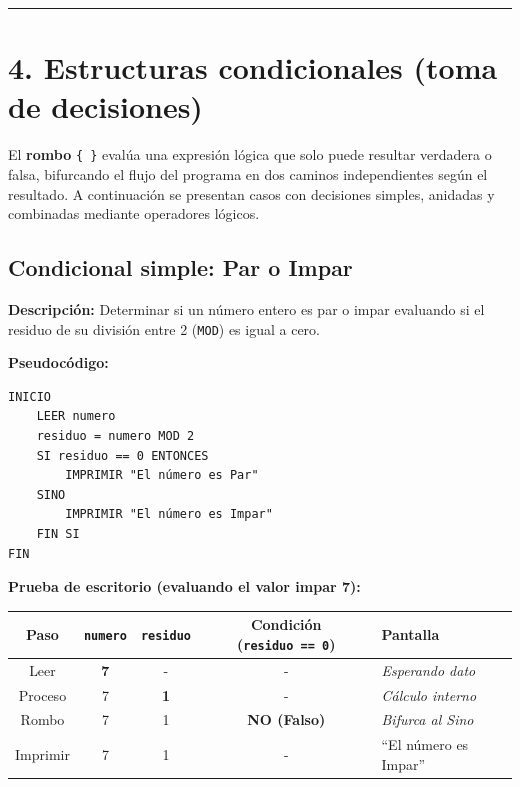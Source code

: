 \begin{center}\rule{0.5\linewidth}{0.5pt}\end{center}

\section{4. Estructuras condicionales (toma de
decisiones)}\label{estructuras-condicionales-toma-de-decisiones}

El \textbf{rombo} \texttt{\{\ \}} evalúa una expresión lógica que solo
puede resultar verdadera o falsa, bifurcando el flujo del programa en
dos caminos independientes según el resultado. A continuación se
presentan casos con decisiones simples, anidadas y combinadas mediante
operadores lógicos.

\subsection{Condicional simple: Par o
Impar}\label{condicional-simple-par-o-impar}

\textbf{Descripción:} Determinar si un número entero es par o impar
evaluando si el residuo de su división entre 2 (\texttt{MOD}) es igual a
cero.

\textbf{Pseudocódigo:}

\begin{verbatim}
INICIO
    LEER numero
    residuo = numero MOD 2
    SI residuo == 0 ENTONCES
        IMPRIMIR "El número es Par"
    SINO
        IMPRIMIR "El número es Impar"
    FIN SI
FIN
\end{verbatim}



\textbf{Prueba de escritorio (evaluando el valor impar 7):}

{\def\LTcaptype{none} %
\begin{longtable}[]{@{}ccccl@{}}
\toprule\noalign{}
Paso & \texttt{numero} & \texttt{residuo} & Condición
(\texttt{residuo\ ==\ 0}) & Pantalla \\
\midrule\noalign{}
\endhead
\bottomrule\noalign{}
\endlastfoot
Leer & \textbf{7} & - & - & \emph{Esperando dato} \\
Proceso & 7 & \textbf{1} & - & \emph{Cálculo interno} \\
Rombo & 7 & 1 & \textbf{NO (Falso)} & \emph{Bifurca al Sino} \\
Imprimir & 7 & 1 & - & ``El número es Impar'' \\
\end{longtable}
}

